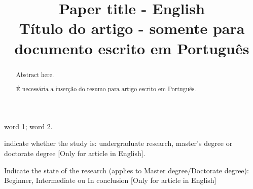 \documentclass[conference]{IEEEtran}
\begin{document}
%
\title{Paper title - English \\ T\'{i}tulo do artigo - somente para documento escrito em Portugu\^{e}s}




% 
\author{
}


\maketitle

\thispagestyle{fancy}

\renewcommand{\abstractname}{Abstract}
\begin{abstract}
Abstract here.
\end{abstract}

\renewcommand\IEEEkeywordsname{Keywords}
\begin{IEEEkeywords}
\label{Keywords}
word 1; word 2.
\end{IEEEkeywords}

\renewcommand\IEEEkeywordsname{Classification}
\begin{IEEEkeywords}
	\label{Classification}
	indicate whether the study is: undergraduate research, master's degree or doctorate degree [Only for article in English].
\end{IEEEkeywords}
\renewcommand\IEEEkeywordsname{Category}
\begin{IEEEkeywords}
	\label{Category}
	Indicate the state of the research (applies to Master degree/Doctorate degree): 
	Beginner, Intermediate ou In conclusion [Only for article in English] 
\end{IEEEkeywords}
\renewcommand{\abstractname}{Resumo}
\begin{abstract}
\label{Resumo}
\'E necess\'aria a inser\c{c}\~{a}o do resumo para artigo escrito em Portugu\^{e}s.
\end{abstract}
\end{document}
